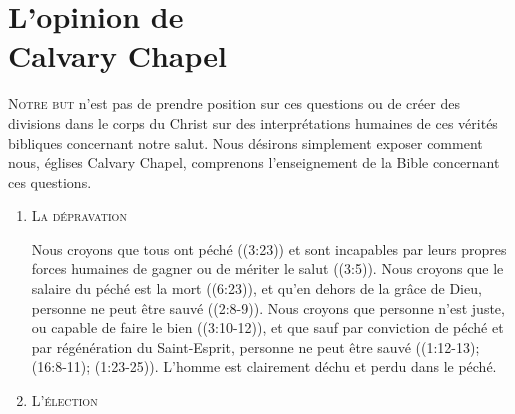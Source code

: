 \chapter[L'opinion de Calvary Chapel]{L'opinion de\\ Calvary Chapel}

\begin{pocketpar}{}
\lettrine{N}{otre but} n'est pas de prendre position sur ces questions
  ou de créer des \pocketlinebreak
 divisions dans le corps du Christ
 sur des interprétations humaines de ces vérités bibliques
 concernant notre salut.
 Nous désirons simplement exposer comment nous,
 églises Calvary Chapel, comprenons l'en\-sei\-gnement de la Bible
 concernant ces questions.
\end{pocketpar}
 
\begin{enumerate}

  \item  \textsc{La dépravation}

\nobreak
\begin{pocketpar}{}
\begin{digestpar}{}
Nous croyons que tous ont péché
 ((3:23)) et
 sont incapables par leurs propres forces humaines de gagner ou
 de mériter le salut ((3:5)).
 Nous croyons que le \pocketlinebreak
 salaire du péché est la mort ((6:23)),
 et qu'en dehors de la grâce de Dieu, personne ne peut être sauvé
 ((2:8-9)).
 Nous cro\-yons que personne n'est juste, ou \pocketlinebreak 
 capable de faire le bien
 (\BRallowhypbch{}(3:10-12)\BRforbidhypbch), et que sauf par
 conviction de péché et par régénération du Saint-Esprit, personne ne peut être sauvé
 (\BRallowhypbch{}(1:12-13);
 (16:8-11);
 (1:23-25)\BRforbidhypbch).
 L'homme est clairement déchu et perdu dans le péché.
\end{digestpar}
\end{pocketpar}


  \item  \textsc{L'élection}


\end{enumerate}
